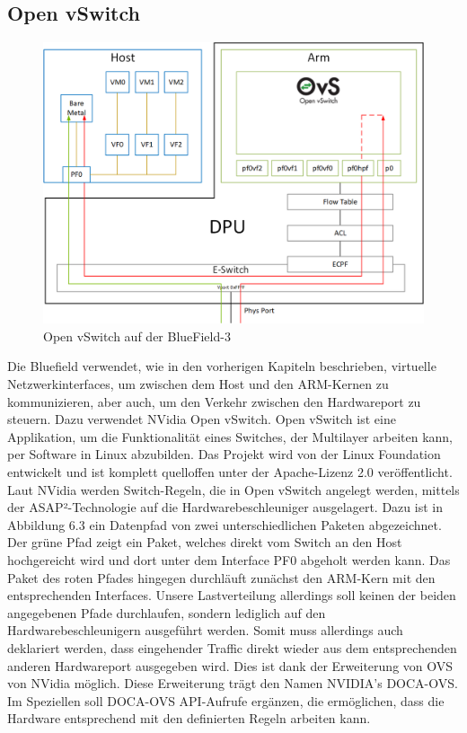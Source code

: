\subsection{Open vSwitch}
\begin{figure}
    \centering
    \includegraphics[width=0.85\linewidth]{images/kernel_representors_model.png}
    \caption{Open vSwitch auf der BlueField-3}
    \label{fig:enter-label}
\end{figure}
Die Bluefield verwendet, wie in den vorherigen Kapiteln beschrieben, virtuelle Netzwerkinterfaces, um zwischen dem Host und den ARM-Kernen zu kommunizieren, aber auch, um den Verkehr zwischen den Hardwareport zu steuern. Dazu verwendet NVidia Open vSwitch. Open vSwitch ist eine Applikation, um die Funktionalität eines Switches, der Multilayer arbeiten kann, per Software in Linux abzubilden. Das Projekt wird von der Linux Foundation entwickelt und ist komplett quelloffen unter der Apache-Lizenz 2.0 veröffentlicht. Laut NVidia werden Switch-Regeln, die in Open vSwitch angelegt werden, mittels der ASAP²-Technologie auf die Hardwarebeschleuniger ausgelagert. Dazu ist in Abbildung 6.3 ein Datenpfad von zwei unterschiedlichen Paketen abgezeichnet. Der grüne Pfad zeigt ein Paket, welches direkt vom Switch an den Host hochgereicht wird und dort unter dem Interface PF0 abgeholt werden kann. Das Paket des roten Pfades hingegen durchläuft zunächst den ARM-Kern mit den entsprechenden Interfaces. Unsere Lastverteilung allerdings soll keinen der beiden angegebenen Pfade durchlaufen, sondern lediglich auf den Hardwarebeschleunigern ausgeführt werden. Somit muss allerdings auch deklariert werden, dass eingehender Traffic direkt wieder aus dem entsprechenden anderen Hardwareport ausgegeben wird. Dies ist dank der Erweiterung von OVS von NVidia möglich. Diese Erweiterung trägt den Namen NVIDIA's DOCA-OVS. Im Speziellen soll DOCA-OVS API-Aufrufe ergänzen, die ermöglichen, dass die Hardware entsprechend mit den definierten Regeln arbeiten kann.
